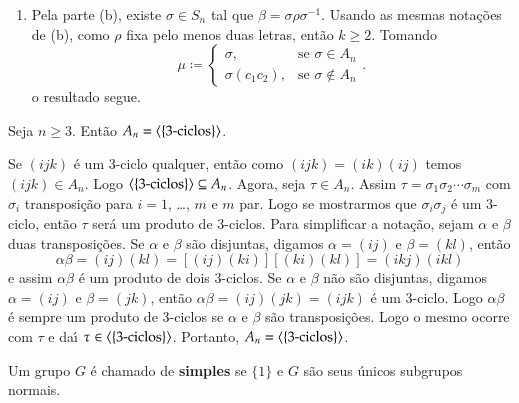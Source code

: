 \begin{prova}
\begin{enumerate}[label=({\roman*})]
		\item Pela parte (b), existe $\sigma \in S_n$ tal que $\beta = \sigma\rho\sigma^{-1}$. Usando as mesmas nota\c{c}\~oes de (b), como $\rho$ fixa pelo menos duas letras, ent\~ao $k \ge 2$. Tomando
		\[
			\mu \coloneqq \begin{cases}
				\sigma, & \mbox{se } \sigma \in A_n\\
				\sigma (c_1 c_2), & \mbox{se } \sigma \notin A_n
			\end{cases}.
		\]
		o resultado segue.
	\end{enumerate}
\end{prova}

\begin{proposicao}\label{grupo_alternado_gerado_por_tres_ciclos}
	Seja $n \ge 3$. Ent\~ao $A_n = \langle{\{3\mbox{-ciclos}\}}\rangle$.
\end{proposicao}
\begin{prova}
	Se $(i j k)$ \'e um 3-ciclo qualquer, ent\~ao como $(i j k) = (i k)(i j)$ temos $(i j k) \in A_n$. Logo $\langle{\{3\mbox{-ciclos}\}}\rangle \subseteq A_n$. Agora, seja $\tau \in A_n$. Assim $\tau = \sigma_1\sigma_2 \cdots \sigma_m$ com $\sigma_i$ transposi\c{c}\~ao para $i = 1$, \dots, $m$ e $m$ par. Logo se mostrarmos que $\sigma_i\sigma_j$ \'e um 3-ciclo, ent\~ao $\tau$ ser\'a um produto de 3-ciclos. Para simplificar a nota\c{c}\~ao, sejam $\alpha$ e $\beta$ duas transposi\c{c}\~oes. Se $\alpha$ e $\beta$ s\~ao disjuntas, digamos $\alpha = (i j)$ e $\beta = (k l)$, ent\~ao
	\[
		\alpha\beta = (i j)(k l) = [(i j)(k i)][(k i)(k l)] = (i k j)(i k l)
	\]
	e assim $\alpha\beta$ \'e um produto de dois 3-ciclos. Se $\alpha$ e $\beta$ n\~ao s\~ao disjuntas, digamos $\alpha = (i j)$ e $\beta = (j k)$, ent\~ao $\alpha\beta = (i j)(j k) = (i j k)$ \'e um 3-ciclo. Logo $\alpha\beta$ \'e sempre um produto de 3-ciclos se $\alpha$ e $\beta$ s\~ao transposi\c{c}\~oes. Logo o mesmo ocorre com $\tau$ e da{\'\i} $\tau \in \langle{\{3\mbox{-ciclos}\}}\rangle$. Portanto, $A_n = \langle{\{3\mbox{-ciclos}\}}\rangle$.
\end{prova}

\begin{definicao}
	Um grupo $G$ \'e chamado de \textbf{simples} se $\{1\}$ e $G$ s\~ao seus \'unicos subgrupos normais.
\end{definicao}

